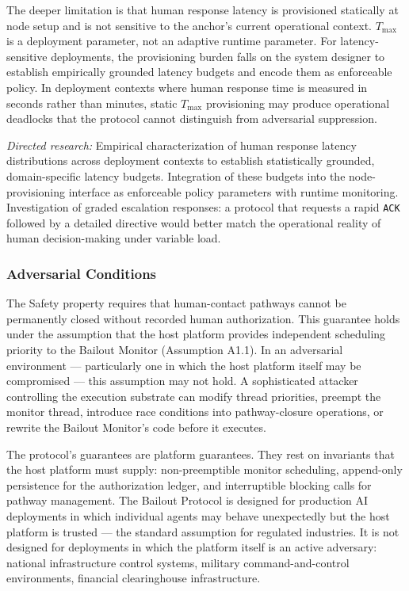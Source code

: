 The deeper limitation is that human response latency is provisioned statically at node setup and is not sensitive to the anchor's current operational context.  $T_{\max}$ is a deployment parameter, not an adaptive runtime parameter.  For latency-sensitive deployments, the provisioning burden falls on the system designer to establish empirically grounded latency budgets and encode them as enforceable policy.  In deployment contexts where human response time is measured in seconds rather than minutes, static $T_{\max}$ provisioning may produce operational deadlocks that the protocol cannot distinguish from adversarial suppression.

\textit{Directed research:} Empirical characterization of human response latency distributions across deployment contexts to establish statistically grounded, domain-specific latency budgets.  Integration of these budgets into the node-provisioning interface as enforceable policy parameters with runtime monitoring.  Investigation of graded escalation responses: a protocol that requests a rapid \texttt{ACK} followed by a detailed directive would better match the operational reality of human decision-making under variable load.

\subsubsection{Adversarial Conditions}
\label{sec:adversarial-conditions}

The Safety property requires that human-contact pathways cannot be permanently closed without recorded human authorization.  This guarantee holds under the assumption that the host platform provides independent scheduling priority to the Bailout Monitor (Assumption A1.1).  In an adversarial environment --- particularly one in which the host platform itself may be compromised --- this assumption may not hold.  A sophisticated attacker controlling the execution substrate can modify thread priorities, preempt the monitor thread, introduce race conditions into pathway-closure operations, or rewrite the Bailout Monitor's code before it executes.

The protocol's guarantees are platform guarantees.  They rest on invariants that the host platform must supply: non-preemptible monitor scheduling, append-only persistence for the authorization ledger, and interruptible blocking calls for pathway management.  The Bailout Protocol is designed for production AI deployments in which individual agents may behave unexpectedly but the host platform is trusted --- the standard assumption for regulated industries.  It is not designed for deployments in which the platform itself is an active adversary: national infrastructure control systems, military command-and-control environments, financial clearinghouse infrastructure.

